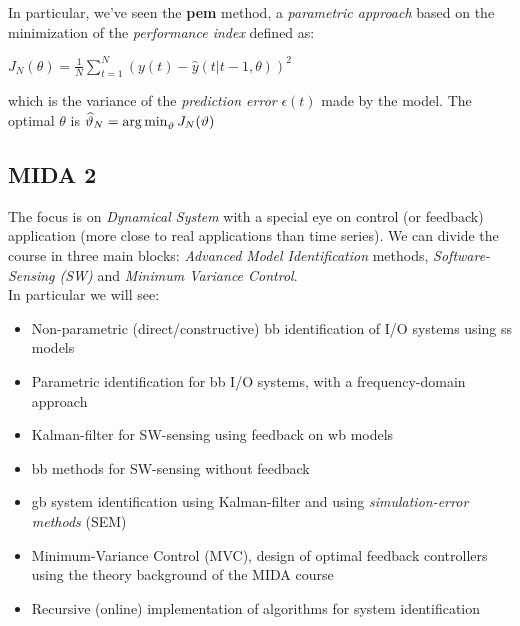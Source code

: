 In particular, we've seen the \textbf{\acrfull{pem}} method, a \emph{parametric approach} based on the minimization of the \emph{performance index} defined as:
\begin{definition}
    $J_{N}(\theta) = \frac{1}{N} \sum_{t=1}^N \left(y(t) - \hat{y}(t|t-1, \theta)\right)^2$
\end{definition}

which is the variance of the \emph{prediction error} $\epsilon(t)$ made by the model. The optimal $\theta$ is $\widehat{\vartheta}_N = \operatorname*{arg\,min}_\vartheta J_{N}(\vartheta)$

\subsection{MIDA 2}

The focus is on \emph{Dynamical System} with a special eye on control (or feedback) application (more close to real applications than time series). We can divide the course in three main blocks: \emph{Advanced Model Identification} methods, \emph{Software-Sensing (SW)} and \emph{Minimum Variance Control}.\\
In particular we will see: 

\begin{itemize}
    \item Non-parametric (direct/constructive) \gls{bb} identification of I/O systems using \acrlong{ss} models
    \item Parametric identification for \gls{bb} I/O systems, with a frequency-domain approach
    \item Kalman-filter for SW-sensing using feedback on \gls{wb} models
    \item \gls{bb} methods for SW-sensing without feedback
    \item \gls{gb} system identification using Kalman-filter and using \emph{simulation-error methods} (SEM)
    \item  Minimum-Variance Control (MVC), design of optimal feedback controllers using the theory background of the MIDA course
    \item Recursive (online) implementation of algorithms for system identification
\end{itemize}

